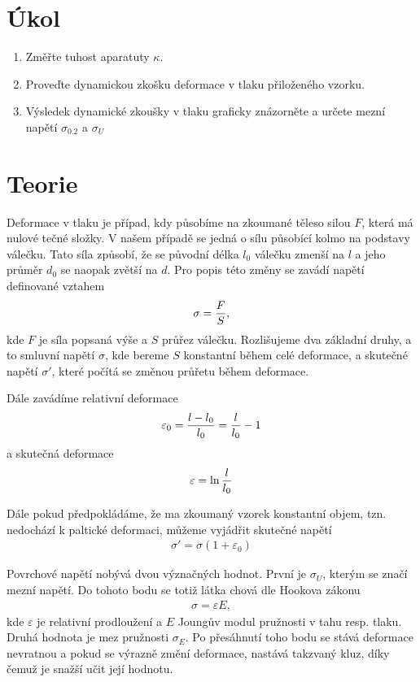 \documentclass[a4paper,12pt]{article}
\begin{document}
%  
\section{Úkol}
\noindent
\begin{enumerate}
	\item Změřte tuhost aparatuty $\kappa$.
	\item Proveďte dynamickou zkošku deformace v tlaku přiloženého vzorku.
	\item Výsledek dynamické zkoušky v tlaku graficky znázorněte a určete mezní napětí $\sigma_{0.2}$ a $\sigma_U$
\end{enumerate}

\section{Teorie}
\noindent
Deformace v tlaku je případ, kdy působíme na zkoumané těleso silou $F$, která má 
nulové tečné složky. V našem případě se jedná o sílu působící kolmo na podstavy 
válečku. Tato síla způsobí, že se původní délka $l_0$ válečku zmenší na $l$ a jeho 
průměr $d_0$ se naopak zvětší na $d$. Pro popis této změny se zavádí napětí definované vztahem
\begin{eqnarray}
	\sigma={F \over S}, 
\end{eqnarray}
kde $F$ je síla popsaná výše a $S$ průřez válečku. Rozlišujeme dva základní druhy, 
a to smluvní napětí $\sigma$, kde bereme $S$ konstantní během celé deformace, a 
skutečné napětí $\sigma'$, které počítá se změnou průřetu během deformace.

Dále zavádíme relativní deformace
\begin{eqnarray}
	\varepsilon_0={l-l_0 \over l_0}={l \over l_0}-1
\end{eqnarray}
a skutečná deformace
\begin{eqnarray}
	\varepsilon=\ln{l \over l_0}
\end{eqnarray}

Dále pokud předpokládáme, že ma zkoumaný vzorek konstantní objem, tzn. nedochází 
k paltické deformaci, můžeme vyjádřit skutečné napětí
\begin{eqnarray}
	\sigma'=\sigma (1+\varepsilon_0)
\end{eqnarray}

Povrchové napětí nobývá dvou význačných hodnot. První je $\sigma_U$, kterým se 
značí mezní napětí. Do tohoto bodu se totiž látka chová dle Hookova zákonu
\begin{eqnarray}
	\sigma=\varepsilon E,
\end{eqnarray} 
kde $\varepsilon$ je relativní prodloužení a $E$ Joungův modul pružnosti v tahu 
resp. tlaku. Druhá hodnota je mez pružnosti $\sigma_E$. Po přesáhnutí toho bodu 
se stává deformace nevratnou a pokud se výrazně změní deformace, nastává takzvaný 
kluz, díky čemuž je snažší učit její hodnotu.
\end{document}
